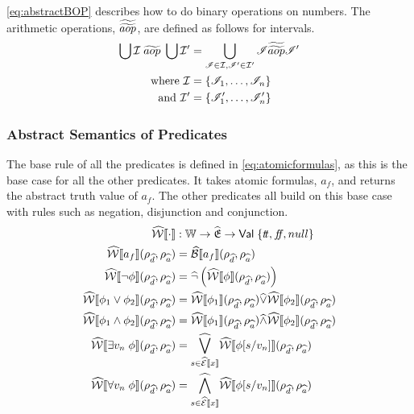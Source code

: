 \autoref{eq:abstractBOP} describes how to do binary operations on numbers.
The arithmetic operations, $\widetilde{\widetilde{aop}}$, are defined as follows for intervals.
\begin{align}\label{eq:abstractBOP}
    \bigcup \mathcal{I} \;\aab{aop}\; \bigcup \mathcal{I}' &= \bigcup_{\mathscr{I}\in \mathcal{I}, \mathscr{I}'\in \mathcal{I}'}\mathscr{I}\aaab{aop}\mathscr{I}'\nonumber\\
    \text{where } \mathcal{I}&=\{\mathscr{I}_1,\dots,\mathscr{I}_n\}\nonumber\\
    \text{and } \mathcal{I}'&=\{\mathscr{I}'_1,\dots,\mathscr{I}'_n\}
\end{align}

\subsubsection{Abstract Semantics of Predicates}
The base rule of all the predicates is defined in \autoref{eq:atomicformulas}, as this is the base case for all the other predicates.
It takes atomic formulas, $a_f$, and returns the abstract truth value of $a_f$.
The other predicates all build on this base case with rules such as negation, disjunction and conjunction.
\begin{align}
    \abspredsem{\cdot} &: \mathbb{W} \rightarrow \ab{\mathfrak{E}} \rightarrow \mathsf{Val} \; \{\true, \false, \mnull\} \\ \label{eq:atomicformulas}
    \abspredsem{a_f}(\rho_{\ab{d}}, \rho_{\ab{a}}) &= \absboolsem{a_f}(\rho_{\ab{d}}, \rho_{\ab{a}}) \\
    \abspredsem{\neg \phi}(\rho_{\ab{d}}, \rho_{\ab{a}}) &= \ab{\neg} \left( \abspredsem{\phi}(\rho_{\ab{d}}, \rho_{\ab{a}}) \right) \\
    \abspredsem{\phi_1 \lor \phi_2}(\rho_{\ab{d}}, \rho_{\ab{a}}) &= \abspredsem{\phi_1}(\rho_{\ab{d}}, \rho_{\ab{a}}) \ab{\lor} \abspredsem{\phi_2}(\rho_{\ab{d}}, \rho_{\ab{a}}) \\
    \abspredsem{\phi_1 \land \phi_2}(\rho_{\ab{d}}, \rho_{\ab{a}}) &= \abspredsem{\phi_1}(\rho_{\ab{d}}, \rho_{\ab{a}}) \ab{\land} \abspredsem{\phi_2}(\rho_{\ab{d}}, \rho_{\ab{a}}) \\
    \abspredsem{\exists v_n \; \phi}(\rho_{\ab{d}}, \rho_{\ab{a}}) &= \underset{s \in \absexpsem{x}}{\ab{\bigvee}} \abspredsem{\phi[s/v_n]}(\rho_{\ab{d}}, \rho_{\ab{a}}) \\
    \abspredsem{\forall v_n \; \phi}(\rho_{\ab{d}}, \rho_{\ab{a}}) &= \underset{s \in \absexpsem{x}}{\ab{\bigwedge}} \abspredsem{\phi[s/v_n]}(\rho_{\ab{d}}, \rho_{\ab{a}})
\end{align}

